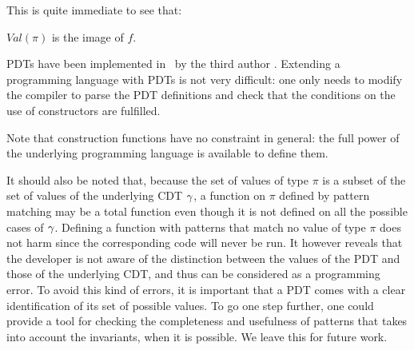 
This is quite immediate to see that:

\begin{lemma}
$Val(\pi)$ is the image of $f$.
\end{lemma}


PDTs have been implemented in \ocaml\ by the third author
\cite{weis03}.  Extending a programming language with PDTs is not very
difficult: one only needs to modify the compiler to parse the PDT
definitions and check that the conditions on the use of constructors
are fulfilled.

Note that construction functions have no constraint in general: the
full power of the underlying programming language is available to
define them.


It should also be noted that, because the set of values of type $\pi$
is a subset of the set of values of the underlying CDT $\gamma$, a
function on $\pi$ defined by pattern matching may be a total function
even though it is not defined on all the possible cases of
$\gamma$. Defining a function with patterns that match no value of type
$\pi$ does not harm since the corresponding code will never be run. It
however reveals that the developer is not aware of the distinction
between the values of the PDT and those of the underlying CDT, and
thus can be considered as a programming error. To avoid this kind of
errors, it is important that a PDT comes with a clear identification
of its set of possible values. To go one step further, one could
provide a tool for checking the completeness and usefulness of
patterns that takes into account the invariants, when it is
possible. We leave this for future work.



